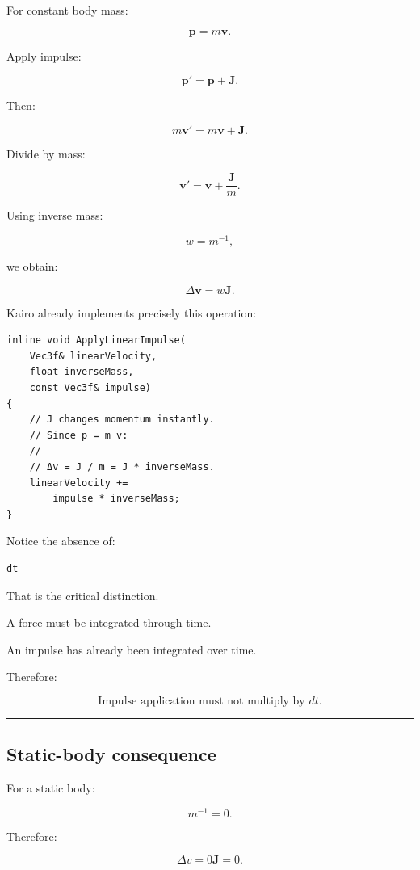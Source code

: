 For constant body mass:

\[
\mathbf p=m\mathbf v.
\]

Apply impulse:

\[
\mathbf p'
=
\mathbf p+\mathbf J.
\]

Then:

\[
m\mathbf v'
=
m\mathbf v+\mathbf J.
\]

Divide by mass:

\[
\boxed{
\mathbf v'
=
\mathbf v+
\frac{\mathbf J}{m}.
}
\]

Using inverse mass:

\[
w=m^{-1},
\]

we obtain:

\[
\boxed{
\Delta\mathbf v
=
w\mathbf J.
}
\]

Kairo already implements precisely this operation:

\begin{verbatim}
inline void ApplyLinearImpulse(
    Vec3f& linearVelocity,
    float inverseMass,
    const Vec3f& impulse)
{
    // J changes momentum instantly.
    // Since p = m v:
    //
    // Δv = J / m = J * inverseMass.
    linearVelocity +=
        impulse * inverseMass;
}
\end{verbatim}

Notice the absence of:

\begin{verbatim}
dt
\end{verbatim}

That is the critical distinction.

A force must be integrated through time.

An impulse has already been integrated over time.

Therefore:

\[
\boxed{
\text{Impulse application must not multiply by }dt.
}
\]

\begin{center}\rule{0.5\linewidth}{0.5pt}\end{center}

\subsection{Static-body consequence}\label{06-engine-ii-ch036-static-body-consequence}

For a static body:

\[
m^{-1}=0.
\]

Therefore:

\[
\Delta v
=
0\mathbf J
=
0.
\]

